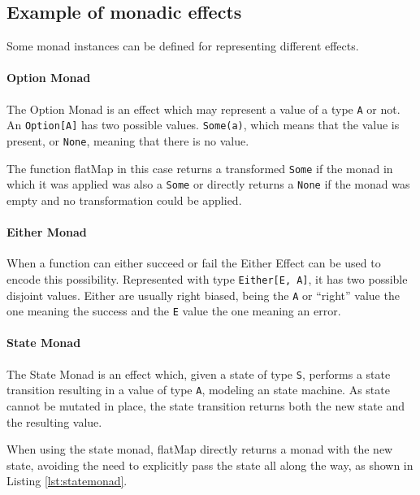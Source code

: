 \documentclass[../main.tex]{subfiles}
\begin{document}
\subsection{Example of monadic effects}
Some monad instances can be defined for representing different effects.

\paragraph{Option Monad}
The Option Monad is an effect which may represent a value of a type \texttt{A} or
not. An \texttt{Option[A]} has two possible values. \texttt{Some(a)}, which means
that the value is present, or \texttt{None}, meaning that there is no value.

The function flatMap in this case returns a transformed \texttt{Some} if the monad in which
it was applied was also a \texttt{Some} or directly returns a \texttt{None} if
the monad was empty and no transformation could be applied.



\paragraph{Either Monad}
When a function can either succeed or fail the Either Effect can be used to encode this
possibility. Represented with type \texttt{Either[E, A]}, it has two possible
disjoint values. Either are usually right biased, being the \texttt{A} or
``right'' value the one meaning the success and the \texttt{E} value the one
meaning an error.



\paragraph{State Monad}
The State Monad is an effect which, given a state of type \texttt{S}, performs a state
transition resulting in a value of type \texttt{A}, modeling an state machine.
As state cannot be mutated in place, the state transition returns both the new
state and the resulting value.

When using the state monad, flatMap directly returns a monad with the new state,
avoiding the need to explicitly pass the state all along the way, as shown in Listing \ref{lst:statemonad}.
\end{document}

